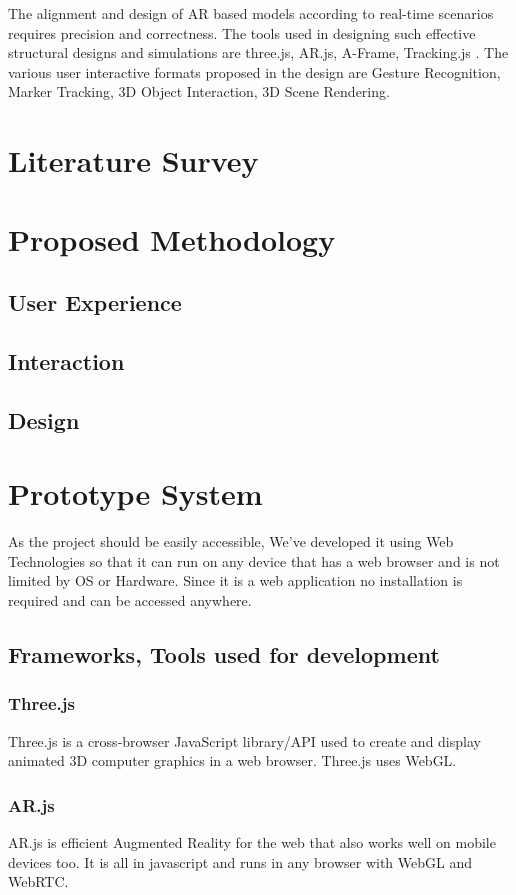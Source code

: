\documentclass[conference]{IEEEtran}
\begin{document}
The alignment and design of AR based models according to real-time scenarios requires precision and correctness. The tools used in designing such effective structural designs and simulations are three.js, AR.js, A-Frame, Tracking.js . The various user interactive formats proposed in the design are Gesture Recognition, Marker Tracking, 3D Object Interaction, 3D Scene Rendering.
\section{Literature Survey}

\section{Proposed Methodology}
\subsection{User Experience}
\subsection{Interaction}
\subsection{Design}

\section{Prototype System}
As the project should be easily accessible, We've developed it using Web Technologies so that it can run on any device that has a web browser and is not limited by OS or Hardware.
Since it is a web application no installation is required and can be accessed anywhere.


\subsection{Frameworks, Tools used for development}
\subsubsection{Three.js} Three.js is a cross-browser JavaScript library/API used to create and display animated 3D computer graphics in a web browser. Three.js uses WebGL.
\subsubsection{AR.js}AR.js is efficient Augmented Reality for the web that also works well on mobile devices too. It is all in javascript and runs in any browser with WebGL and WebRTC. 
\end{document}

